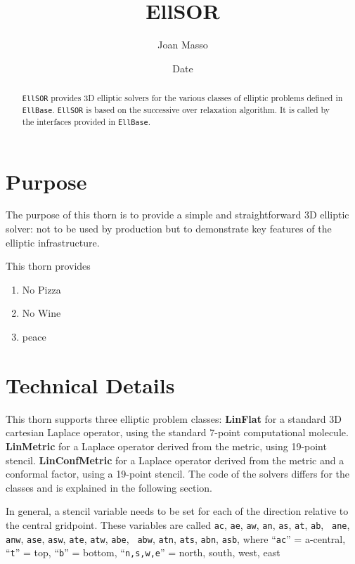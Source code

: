 \documentclass{article}
\begin{document}
\title{EllSOR}
\author{Joan Masso}
\date{$ $Date$ $}

\maketitle


\begin{abstract}
{\tt EllSOR} provides 3D elliptic solvers for the various
classes of elliptic problems defined in {\tt EllBase}. {\tt EllSOR} is 
based on the successive over relaxation algorithm. It is called by the
interfaces provided in {\tt EllBase}.
\end{abstract}

\section{Purpose}
The purpose of this thorn is to provide a simple and straightforward
3D elliptic solver: not to be used by production but to demonstrate key
features of the elliptic infrastructure.

This thorn provides
 \begin{enumerate}
  \item No Pizza
  \item No Wine
  \item peace
 \end{enumerate}

\section{Technical Details}
This thorn supports three elliptic problem classes: {\bf LinFlat} for 
a standard 3D cartesian Laplace operator, using the standard 7-point
computational molecule. {\bf LinMetric} for a Laplace operator derived
from the metric, using 19-point stencil. {\bf LinConfMetric} for a
Laplace operator derived from the metric and a conformal factor, using 
a 19-point stencil. The code of the solvers differs for the classes
and is explained in the following section. 

In general, a stencil variable needs to be set for each of the
direction relative to the central gridpoint. These variables are
called {\tt ac}, {\tt ae}, {\tt aw}, {\tt an}, {\tt as}, {\tt at}, {\tt ab}, {\tt
ane}, {\tt anw}, {\tt ase}, {\tt asw}, {\tt ate}, {\tt atw}, {\tt abe}, {\tt
abw}, {\tt atn}, {\tt ats}, {\tt abn}, {\tt asb}, where ``{\tt ac}'' =
a-central, ``{\tt t}'' = top, ``{\tt b}'' = bottom, ``{\tt n,s,w,e}'' = north, south, west, east
\end{document}
